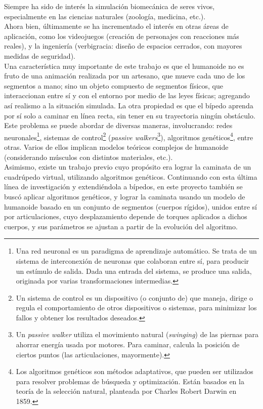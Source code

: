 \documentclass{article}
\begin{document}
Siempre ha sido de inter\'es la simulaci\'on biomec\'anica de seres vivos, especialmente en las ciencias naturales (zoolog\'ia, medicina, etc.). \\
Ahora bien, \'ultimamente se ha incrementado el inter\'es en otras \'areas de aplicaci\'on, como los videojuegos (creaci\'on de personajes con reacciones m\'as reales), y la ingenier\'ia (verbigracia: dise\~no de espacios cerrados, con mayores medidas de seguridad).\\
Una caracter\'istica muy importante de este trabajo es que el humanoide no es fruto de una animaci\'on realizada por un artesano, que mueve cada uno de los segmentos a mano; sino un objeto compuesto de segmentos f\'isicos, que interaccionan entre s\'i y con el entorno por medio de las leyes f\'isicas; agregando as\'i realismo a la situaci\'on simulada.  La otra propiedad es que el b\'ipedo aprenda por s\'i solo a caminar en l\'inea recta, sin tener en su trayectoria ning\'un obst\'aculo.\\
Este problema se puede abordar de diversas maneras, involucrando: redes neuronales\footnote{Una red neuronal es un paradigma de aprendizaje autom\'atico. Se trata de un sistema de interconexi\'on de neuronas que colaboran entre s\'i, para producir un est\'imulo de salida. Dada una entrada del sistema, se produce una salida, originada por varias transformaciones intermedias.}, sistemas de control\footnote{Un sistema de control es un dispositivo (o conjunto de) que maneja, dirige o regula el comportamiento de otros dispositivos o sistemas, para minimizar los fallos y obtener los resultados deseados.} (\textit{passive walkers}\footnote{Un \textit{passive walker} utiliza el movimiento natural (\textit{swinging}) de las piernas para ahorrar energ\'ia usada por motores. Para caminar, calcula la posici\'on de ciertos puntos (las articulaciones, mayormente).})\cite{Wojtyra}, algoritmos gen\'eticos\footnote{Los algoritmos gen\'eticos son m\'etodos adaptativos, que pueden ser utilizados para resolver problemas de b\'usqueda y optimizaci\'on. Est\'an basados en la teor\'ia de la selecci\'on natural, planteada por Charles Robert Darwin en 1859.}\cite{flexibleMuscle}, entre otras. Varios de ellos implican modelos te\'oricos complejos de humanoide (considerando m\'usculos con distintos materiales, etc.). \\
Asimismo, existe un trabajo previo cuyo prop\'osito era lograr la caminata de un cuadr\'upedo virtual, utilizando algoritmos gen\'eticos\cite{Cuadrupedo}. Continuando con esta \'ultima l\'inea de investigaci\'on y extendi\'endola a b\'ipedos, en este proyecto tambi\'en se busc\'o aplicar algoritmos gen\'eticos, y lograr la caminata usando un modelo de humanoide basado en un conjunto de segmentos (cuerpos r\'igidos), unidos entre s\'i por articulaciones, cuyo desplazamiento depende de torques aplicados a dichos cuerpos, y sus par\'ametros se ajustan a partir de la evoluci\'on del algoritmo. \\
\end{document}
